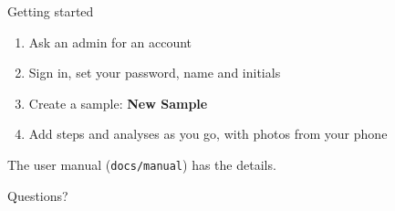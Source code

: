 \documentclass[aspectratio=169,11pt]{beamer}
\newcommand{\ui}[1]{\textsf{\textbf{#1}}}
\begin{document}
\begin{frame}{Getting started}
  \begin{enumerate}
    \item Ask an admin for an account
    \item Sign in, set your password, name and \alert{initials}
    \item Create a sample: \ui{New Sample}
    \item Add steps and analyses as you go, with photos from your phone
  \end{enumerate}

  \vspace{0.5cm}
  The user manual (\texttt{docs/manual}) has the details.
\end{frame}

\begin{frame}[standout]
  Questions?
\end{frame}
\end{document}
